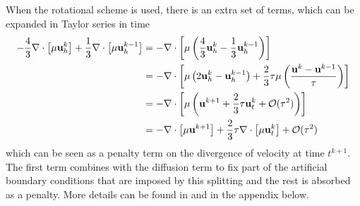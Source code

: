 \documentclass[letterpaper]{erdc}
\begin{document}
\begin{remark}
  When the rotational scheme is used, there is an extra set of terms, which can be expanded in Taylor series in time 
  \begin{align}
    -\frac{4}{3}\nabla\cdot\left[\mu\textbf{u}_h^{k}\right] + \frac{1}{3}\nabla\cdot\left[\mu\textbf{u}_h^{k-1}\right] &= -\nabla\cdot\left[\mu\left(\frac{4}{3}\textbf{u}_h^{k} - \frac{1}{3}\textbf{u}_h^{k-1} \right)\right]\\
    &= -\nabla\cdot\left[\mu \left(2\textbf{u}_h^{k} - \textbf{u}_h^{k-1}  \right) + \frac{2}{3}\tau\mu\left( \frac{\textbf{u}^{k} - \textbf{u}^{k-1}}{\tau} \right)   \right]\\
    &= -\nabla\cdot\left[\mu\left( \textbf{u}^{k+1} + \frac{2}{3}\tau\textbf{u}_t^{k} + \mathcal{O}(\tau^{2}) \right)\right]\\
    &= -\nabla\cdot\left[\mu\textbf{u}^{k+1}\right] + \frac{2}{3}\tau\nabla\cdot\left[\mu\textbf{u}_t^{k}\right] + \mathcal{O}(\tau^{2})
  \end{align}
  which can be seen as a penalty term on the divergence of velocity at time $t^{k+1}$.  The first term combines with the diffusion term to fix part of the artificial boundary conditions that are imposed by this splitting and the rest is absorbed as a penalty.  More details can be found in \cite{guermond2004error} and in the appendix below.
\end{remark}

\end{document}
